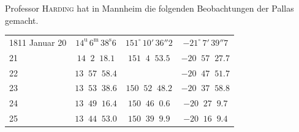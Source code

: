 \par\indent Professor \textsc{Harding} hat in Mannheim die folgenden Beobachtungen der Pallas gemacht.
\begin{center}\fontsize{10}{12}\selectfont\setlength{\tabcolsep}{4pt}\renewcommand{\arraystretch}{1.15}
\begin{tabular}{l|c|c|c}
1811 Januar 20 & $14^{\mathrm u}\,6^{\mathrm m}\,38^{\mathrm s}6$ & $151^\circ\,10'\,36''2$ & $-21^\circ\,7'\,39''7$ \\
\phantom{1811 Januar }21 & $14\;\;2\;\;18.1$ & $151\;\;4\;\;53.5$ & $-20\;\;57\;\;27.7$ \\
\phantom{1811 Januar }22 & $13\;\;57\;\;58.4$ & & $-20\;\;47\;\;51.7$ \\
\phantom{1811 Januar }23 & $13\;\;53\;\;38.6$ & $150\;\;52\;\;48.2$ & $-20\;\;37\;\;58.8$ \\
\phantom{1811 Januar }24 & $13\;\;49\;\;16.4$ & $150\;\;46\;\;0.6$ & $-20\;\;27\;\;9.7$ \\
\phantom{1811 Januar }25 & $13\;\;44\;\;53.0$ & $150\;\;39\;\;9.9$ & $-20\;\;16\;\;9.4$ \\
\end{tabular}
\end{center}


